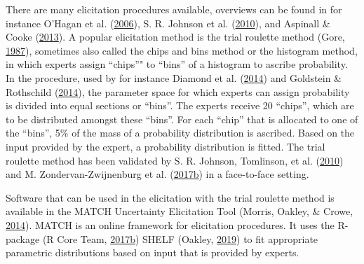 \documentclass[openright,titlepage,12pt,a4paper]{book}
\begin{document}
There are many elicitation procedures available, overviews can be found in for instance O'Hagan et al. (\protect\hyperlink{ref-ohagan_uncertain_2006}{2006}), S. R. Johnson et al. (\protect\hyperlink{ref-johnson_methods_2010}{2010}), and Aspinall \& Cooke (\protect\hyperlink{ref-aspinall_quantifying_2013}{2013}). A popular elicitation method is the trial roulette method (Gore, \protect\hyperlink{ref-gore_biostatistics_1987}{1987}), sometimes also called the chips and bins method or the histogram method, in which experts assign ``chips''" to ``bins'' of a histogram to ascribe probability. In the procedure, used by for instance Diamond et al. (\protect\hyperlink{ref-diamond_expert_2014}{2014}) and Goldstein \& Rothschild (\protect\hyperlink{ref-goldstein_lay_2014}{2014}), the parameter space for which experts can assign probability is divided into equal sections or ``bins''. The experts receive 20 ``chips'', which are to be distributed amongst these ``bins''. For each ``chip'' that is allocated to one of the ``bins'', 5\% of the mass of a probability distribution is ascribed. Based on the input provided by the expert, a probability distribution is fitted. The trial roulette method has been validated by S. R. Johnson, Tomlinson, et al. (\protect\hyperlink{ref-johnson_valid_2010}{2010}) and M. Zondervan-Zwijnenburg et al. (\protect\hyperlink{ref-zondervan-zwijnenburg_application_2017}{2017}\protect\hyperlink{ref-zondervan-zwijnenburg_application_2017}{b}) in a face-to-face setting.

Software that can be used in the elicitation with the trial roulette method is available in the MATCH Uncertainty Elicitation Tool (Morris, Oakley, \& Crowe, \protect\hyperlink{ref-morris_web-based_2014}{2014}). MATCH is an online framework for elicitation procedures. It uses the R-package (R Core Team, \protect\hyperlink{ref-r_core_team_r:_2017}{2017}\protect\hyperlink{ref-r_core_team_r:_2017}{b}) SHELF (Oakley, \protect\hyperlink{ref-R-SHELF}{2019}) to fit appropriate parametric distributions based on input that is provided by experts.
\end{document}
